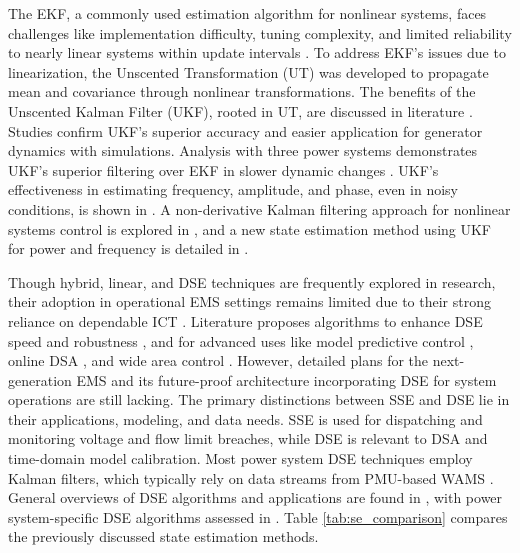 The EKF, a commonly used estimation algorithm for nonlinear systems, faces challenges like implementation difficulty, tuning complexity, and limited reliability to nearly linear systems within update intervals \autocite{1271397}. To address EKF's issues due to linearization, the Unscented Transformation (UT) was developed to propagate mean and covariance through nonlinear transformations. The benefits of the Unscented Kalman Filter (UKF), rooted in UT, are discussed in literature \autocite{Valverde2011, 6019414, 6112697}. Studies \autocite{5619951, 6112697} confirm UKF's superior accuracy and easier application for generator dynamics with simulations. Analysis with three power systems demonstrates UKF's superior filtering over EKF in slower dynamic changes \autocite{Valverde2011}. UKF's effectiveness in estimating frequency, amplitude, and phase, even in noisy conditions, is shown in \autocite{6019414}. A non-derivative Kalman filtering approach for nonlinear systems control is explored in \autocite{5892889}, and a new state estimation method using UKF for power and frequency is detailed in \autocite{6142065}.


Though hybrid, linear, and DSE techniques are frequently explored in research, their adoption in operational EMS settings remains limited due to their strong reliance on dependable ICT \autocite{8624411}. Literature proposes algorithms to enhance DSE speed and robustness \autocite{7742899,WANG2020105390,8063917,7864445}, and for advanced uses like model predictive control \autocite{5342446, 6632979}, online DSA \autocite{SUN2016160, 6158623}, and wide area control \autocite{6202751}. However, detailed plans for the next-generation EMS and its future-proof architecture incorporating DSE for system operations are still lacking. The primary distinctions between SSE and DSE lie in their applications, modeling, and data needs. SSE is used for dispatching and monitoring voltage and flow limit breaches, while DSE is relevant to DSA and time-domain model calibration. Most power system DSE techniques employ Kalman filters, which typically rely on data streams from PMU-based WAMS \autocite{6802979,5871327,7501856,TEBIANIAN2015109}. General overviews of DSE algorithms and applications are found in \autocite{Simon_2006,Singh_Pal_2019}, with power system-specific DSE algorithms assessed in \autocite{6887334}. Table \ref{tab:se_comparison} compares the previously discussed state estimation methods.


